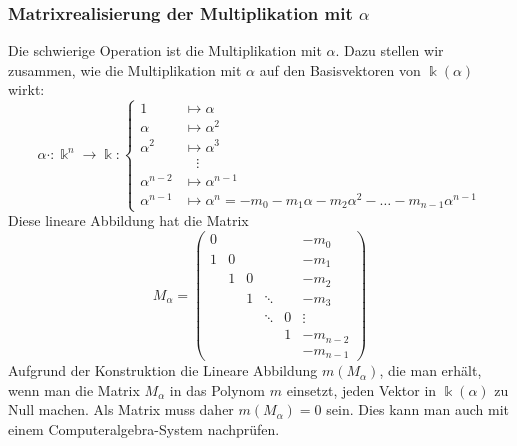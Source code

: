 \subsubsection{Matrixrealisierung der Multiplikation mit $\alpha$}
Die schwierige Operation ist die Multiplikation mit $\alpha$.
Dazu stellen wir zusammen, wie die Multiplikation mit $\alpha$ auf den
Basisvektoren von $\Bbbk(\alpha)$ wirkt:
\[
\alpha\cdot\colon
\Bbbk^n\to\Bbbk
:
\left\{
\begin{aligned}
     1  &\mapsto \alpha   \\
\alpha  &\mapsto \alpha^2 \\
\alpha^2&\mapsto \alpha^3 \\
        &\phantom{m}\vdots\\
\alpha^{n-2}&\mapsto \alpha^{n-1}\\
\alpha^{n-1}&\mapsto \alpha^n = -m_0-m_1\alpha-m_2\alpha^2-\dots-m_{n-1}\alpha^{n-1}
\end{aligned}
\right.
\]
Diese lineare Abbildung hat die Matrix
\[
M_{\alpha}
=
\begin{pmatrix}
0   &    &    &      &   &-m_0    \\
1   & 0  &    &      &   &-m_1    \\
    & 1  & 0  &      &   &-m_2    \\
    &    & 1  &\ddots&   &-m_3    \\
    &    &    &\ddots& 0 &\vdots  \\
    &    &    &      & 1 &-m_{n-2}\\
    &    &    &      &   &-m_{n-1}
\end{pmatrix}
\]
Aufgrund der Konstruktion die Lineare Abbildung $m(M_\alpha)$,
die man erhält, wenn
man die Matrix $M_\alpha$ in das Polynom $m$ einsetzt, jeden Vektor
in $\Bbbk(\alpha)$ zu Null machen.
Als Matrix muss daher $m(M_\alpha)=0$ sein.
Dies kann man auch mit einem Computeralgebra-System nachprüfen.

